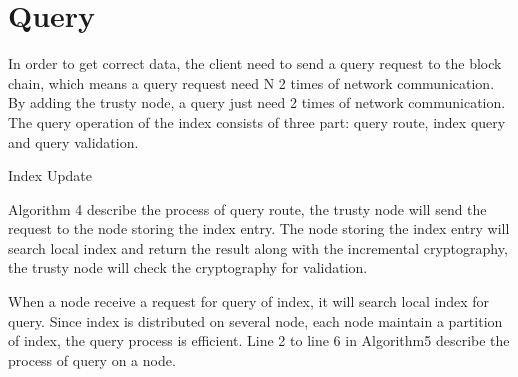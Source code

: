 \section{Query}
\vspace{-0.2cm}
In order to get correct data, the client need to send a
query request to the block chain, which means a query request need N 2 times of network communication. By adding the trusty node, a query just need 2 times of network communication. The query operation of the index consists of three part: query route, index query and query validation.

\LinesNumbered
\vspace{-0.5cm}
\begin{algorithm}[htb]
	\SetAlgoLined
	\caption{Index Update}%
	
\end{algorithm}



Algorithm 4 describe the process of query route, the trusty node will send the request to the node storing the index entry. The node storing the index entry will search local index and return the result along with the incremental cryptography, the trusty node will check the cryptography for validation.



When a node receive a request for query of index, it will search local index for query. Since index is distributed on
several node, each node maintain a partition of index, the query process is efficient. Line 2 to line 6 in Algorithm5
describe the process of query on a node.

